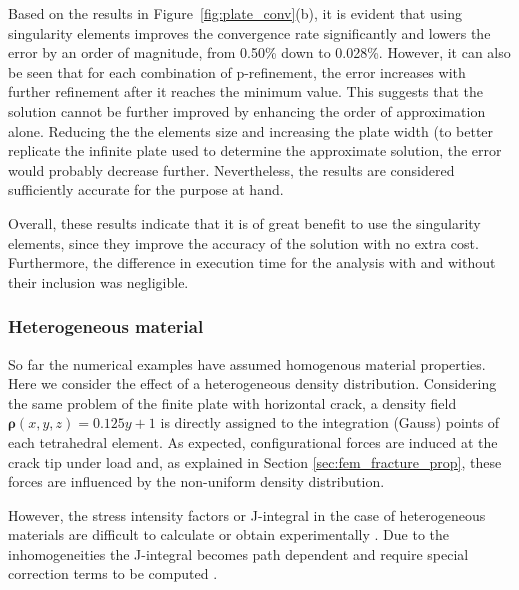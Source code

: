 \documentclass[onecolumn]{svjour3}
\begin{document}
Based on the results in Figure~\ref{fig:plate_conv}(b), it is evident that using singularity elements improves the convergence rate significantly and lowers the error by an order of magnitude, from 0.50\% down to 0.028\%. 
However, it can also be seen that for each combination of p-refinement, the error increases with further refinement after it reaches the minimum value. 
This suggests that the solution cannot be further improved by enhancing the order of approximation alone. 
Reducing the the elements size and increasing the plate width (to better replicate the infinite plate used to determine the approximate solution, the error would probably decrease further. 
Nevertheless, the results are considered sufficiently accurate for the purpose at hand. 

Overall, these results indicate that it is of great benefit to use the singularity elements, since they improve the accuracy of the solution with no extra cost.
Furthermore, the difference in execution time for the analysis with and without their inclusion was negligible. 

\subsubsection{Heterogeneous material}

So far the numerical examples have assumed homogenous material properties. Here we consider the effect of a heterogeneous density distribution. 
Considering the same problem of the finite plate with horizontal crack, a density field $\mathbf{\rho}(x,y,z) = 0.125y + 1$ is directly assigned to the integration (Gauss) points of each tetrahedral element.
As expected, configurational forces are induced at the crack tip under load and, as explained in Section \ref{sec:fem_fracture_prop}, these forces are influenced by the non-uniform density distribution. 

However, the stress intensity factors or J-integral in the case of heterogeneous materials are difficult to calculate or obtain experimentally \citep{fischer_problems_2014}. Due to the inhomogeneities the J-integral becomes path dependent and require special correction terms to be computed \citep{eischen_fracture_1987, chang_extension_2002}. 
\end{document}
